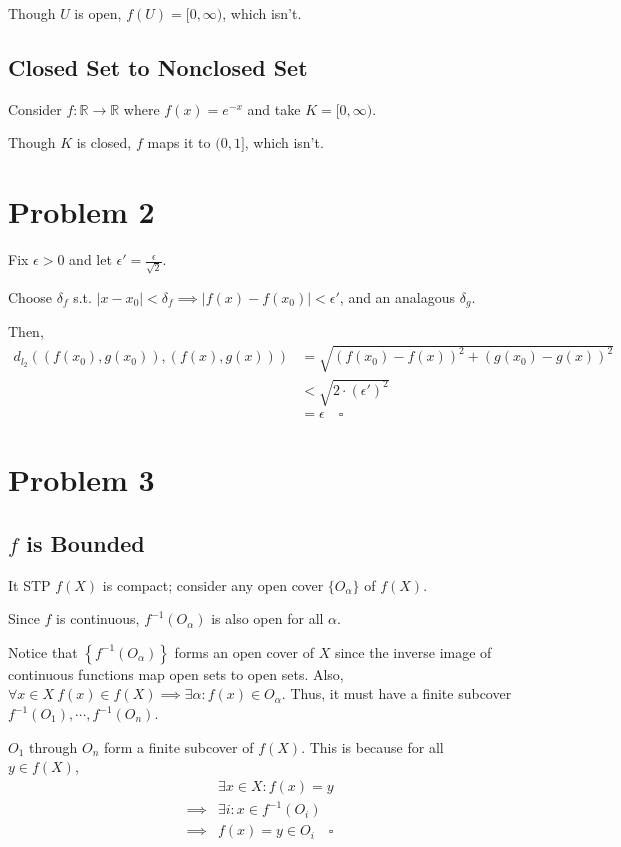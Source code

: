 \documentclass[12pt]{article}
\newcommand{\R}{\mathbb{R}}
\begin{document}
Though $U$ is open, $f(U) = [0, \infty)$, which isn't.

\subsection{Closed Set to Nonclosed Set}

Consider $f: \R \to \R$ where $f(x)=e^{-x}$ and take $K = [0, \infty)$.

Though $K$ is closed, $f$ maps it to $(0, 1]$, which isn't.

\pagebreak

\section{Problem 2}

Fix $\epsilon > 0$ and let $\epsilon' = \frac{\epsilon}{\sqrt{2}}$.

Choose $\delta_f$ s.t. $|x-x_0| < \delta_f \implies |f(x)-f(x_0)| < \epsilon'$, and an analagous $\delta_g$.

Then,
\begin{align*}
  d_{l_2}((f(x_0), g(x_0)), (f(x), g(x)))
   & = \sqrt{(f(x_0)-f(x))^2+(g(x_0)-g(x))^2} \\
   & < \sqrt{2 \cdot (\epsilon')^2}           \\
   & = \epsilon\quad\square
\end{align*}

\section{Problem 3}

\subsection{\texorpdfstring{$f$}{f} is Bounded}

It STP $f(X)$ is compact; consider any open cover $\{O_\alpha\}$ of $f(X)$.

Since $f$ is continuous, $f^{-1}(O_\alpha)$ is also open for all $\alpha$.

Notice that $\left\{f^{-1}(O_\alpha)\right\}$ forms an open cover of $X$
since the inverse image of continuous functions map open sets to open sets.
Also, $\forall x \in X\ f(x) \in f(X) \implies \exists \alpha: f(x) \in O_\alpha$.
Thus, it must have a finite subcover $f^{-1}(O_1), \cdots, f^{-1}(O_n)$.

$O_1$ through $O_n$ form a finite subcover of $f(X)$.
This is because for all $y \in f(X)$,
\begin{align*}
             & \exists x \in X: f(x)=y      \\
  \implies{} & \exists i: x \in f^{-1}(O_i) \\
  \implies{} & f(x)=y \in O_i\quad\square
\end{align*}
\end{document}
